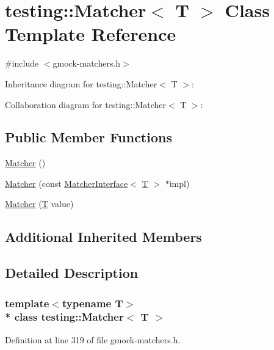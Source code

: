 \hypertarget{classtesting_1_1_matcher}{}\section{testing\+:\+:Matcher$<$ T $>$ Class Template Reference}
\label{classtesting_1_1_matcher}


{\ttfamily \#include $<$gmock-\/matchers.\+h$>$}



Inheritance diagram for testing\+:\+:Matcher$<$ T $>$\+:


Collaboration diagram for testing\+:\+:Matcher$<$ T $>$\+:
\subsection*{Public Member Functions}
\begin{DoxyCompactItemize}
\item 
\hyperlink{classtesting_1_1_matcher_a57bfc9e62d7f6acfee5ad88d1077931c}{Matcher} ()
\item 
\hyperlink{classtesting_1_1_matcher_aea32eb3f86233853de91929fb2691bf3}{Matcher} (const \hyperlink{classtesting_1_1_matcher_interface}{Matcher\+Interface}$<$ \hyperlink{functions__7_8js_adf1f3edb9115acb0a1e04209b7a9937b}{T} $>$ $\ast$impl)
\item 
\hyperlink{classtesting_1_1_matcher_adc75e0bd47ffc75ba8a5f760372d0493}{Matcher} (\hyperlink{functions__7_8js_adf1f3edb9115acb0a1e04209b7a9937b}{T} value)
\end{DoxyCompactItemize}
\subsection*{Additional Inherited Members}


\subsection{Detailed Description}
\subsubsection*{template$<$typename T$>$\\*
class testing\+::\+Matcher$<$ T $>$}



Definition at line 319 of file gmock-\/matchers.\+h.



